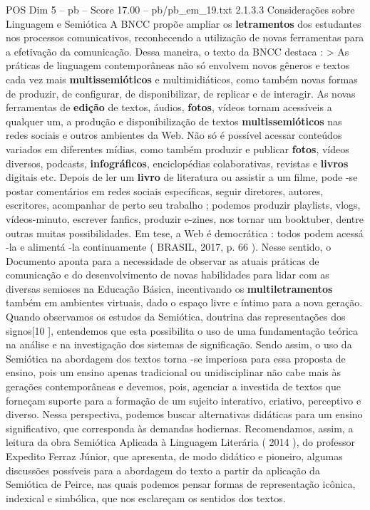 \begin{textsample}{POS Dim 5 – pb – Score 17.00 – pb/pb\_em\_19.txt}  \label{ex:f5_pos_091}
2.1.3.3 Considerações sobre Linguagem e Semiótica A BNCC propõe ampliar os \textbf{letramentos} dos estudantes nos processos comunicativos, reconhecendo a utilização de novas ferramentas para a efetivação da comunicação.
Dessa maneira, o texto da BNCC destaca : > As práticas de linguagem contemporâneas não só envolvem novos gêneros e textos cada vez mais \textbf{multissemióticos} e multimidiáticos, como também novas formas de produzir, de configurar, de disponibilizar, de replicar e de interagir.
As novas ferramentas de \textbf{edição} de textos, áudios, \textbf{fotos}, vídeos tornam acessíveis a qualquer um, a produção e disponibilização de textos \textbf{multissemióticos} nas redes sociais e outros ambientes da Web.
Não só é possível acessar conteúdos variados em diferentes mídias, como também produzir e publicar \textbf{fotos}, vídeos diversos, podcasts, \textbf{infográficos}, enciclopédias colaborativas, revistas e \textbf{livros} digitais etc.
Depois de ler um \textbf{livro} de literatura ou assistir a um filme, pode -se postar comentários em redes sociais específicas, seguir diretores, autores, escritores, acompanhar de perto seu trabalho ; podemos produzir playlists, vlogs, vídeos-minuto, escrever fanfics, produzir e-zines, nos tornar um booktuber, dentre outras muitas possibilidades.
Em tese, a Web é democrática : todos podem acessá -la e alimentá -la continuamente ( BRASIL, 2017, p. 66 ).
Nesse sentido, o Documento aponta para a necessidade de observar as atuais práticas de comunicação e do desenvolvimento de novas habilidades para lidar com as diversas semioses na Educação Básica, incentivando os \textbf{multiletramentos} também em ambientes virtuais, dado o espaço livre e íntimo para a nova geração.
Quando observamos os estudos da Semiótica, doutrina das representações dos signos[10 ], entendemos que esta possibilita o uso de uma fundamentação teórica na análise e na investigação dos sistemas de significação.
Sendo assim, o uso da Semiótica na abordagem dos textos torna -se imperiosa para essa proposta de ensino, pois um ensino apenas tradicional ou unidisciplinar não cabe mais às gerações contemporâneas e devemos, pois, agenciar a investida de textos que forneçam suporte para a formação de um sujeito interativo, criativo, perceptivo e diverso.
Nessa perspectiva, podemos buscar alternativas didáticas para um ensino significativo, que corresponda às demandas hodiernas.
Recomendamos, assim, a leitura da obra Semiótica Aplicada à Linguagem Literária ( 2014 ), do professor Expedito Ferraz Júnior, que apresenta, de modo didático e pioneiro, algumas discussões possíveis para a abordagem do texto a partir da aplicação da Semiótica de Peirce, nas quais podemos pensar formas de representação icônica, indexical e simbólica, que nos esclareçam os sentidos dos textos.

\end{textsample}

